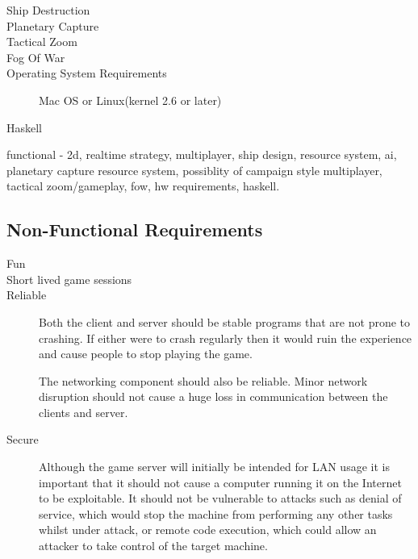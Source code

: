 \begin{description}
\item[Ship Destruction]







\item[Planetary Capture]


\item[Tactical Zoom]

\item[Fog Of War]

\item[Operating System Requirements]
Mac OS or Linux(kernel 2.6 or later) 

\item[Haskell]

\end{description}

functional - 2d, realtime strategy, multiplayer, ship design, resource system, ai, planetary capture resource system, possiblity of campaign style multiplayer, tactical zoom/gameplay, fow, hw requirements, haskell.


\subsection{Non-Functional Requirements}

\begin{description}

	\item[Fun]

	\item[Short lived game sessions]

	\item[Reliable]

		Both the client and server should be stable programs that are not prone to
		crashing. If either were to crash regularly then it would ruin the experience
		and cause people to stop playing the game.

		The networking component should also be reliable. Minor network disruption should
		not cause a huge loss in communication between the clients and server.

	\item[Secure]

		Although the game server will initially be intended for LAN usage it is
		important that it should not cause a computer running it on the Internet to be
		exploitable. It should not be vulnerable to attacks such as denial of service,
		which would stop the machine from performing any other tasks whilst under attack,
		or remote code execution, which could allow an attacker to take control of the
		target machine.

\end{description}

